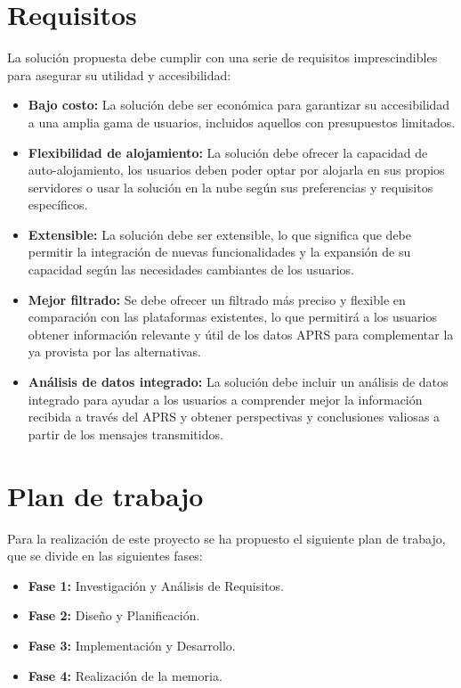 \section{Requisitos}
\label{sec:Requisitos}

La solución propuesta debe cumplir con una serie de requisitos imprescindibles para asegurar su utilidad y accesibilidad:

\begin{itemize}
    \item \textbf{Bajo costo:} La solución debe ser económica para garantizar su accesibilidad a una amplia gama de usuarios, incluidos aquellos con presupuestos limitados.
    
    \item \textbf{Flexibilidad de alojamiento:} La solución debe ofrecer la capacidad de auto-alojamiento, los usuarios deben poder optar por alojarla en sus propios servidores o usar la solución en la nube según sus preferencias y requisitos específicos.
    
    \item \textbf{Extensible:} La solución debe ser extensible, lo que significa que debe permitir la integración de nuevas funcionalidades y la expansión de su capacidad según las necesidades cambiantes de los usuarios.
    
    \item \textbf{Mejor filtrado:} Se debe ofrecer un filtrado más preciso y flexible en comparación con las plataformas existentes, lo que permitirá a los usuarios obtener información relevante y útil de los datos APRS para complementar la ya provista por las alternativas.
    
	\item \textbf{Análisis de datos integrado:} La solución debe incluir un análisis de datos integrado para ayudar a los usuarios a comprender mejor la información recibida a través del APRS y obtener perspectivas y conclusiones valiosas a partir de los mensajes transmitidos.
	
\end{itemize}

\section{Plan de trabajo}

Para la realización de este proyecto se ha propuesto el siguiente plan de trabajo, que se divide en las siguientes fases:

\begin{itemize}
	\item \textbf{Fase 1:} Investigación y Análisis de Requisitos.
	\item \textbf{Fase 2:} Diseño y Planificación.
	\item \textbf{Fase 3:} Implementación y Desarrollo.
	\item \textbf{Fase 4:} Realización de la memoria.
\end{itemize}

